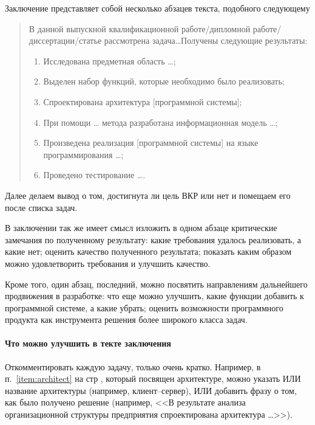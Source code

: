 \documentclass[a4paper,14pt,final]{extreport}
\begin{document}
Заключение представляет собой несколько абзацев текста, подобного следующему
\begin{quote}
В данной выпускной квалификационной работе/дипломной работе/диссертации/статье рассмотрена задача\ldots Получены следующие результаты:
\begin{enumerate}
\item Исследована предметная область \ldots{};
\item Выделен набор функций, которые необходимо было реализовать;
\item Спроектирована архитектура [программной системы]; \label{item:architect}
\item При помощи \ldots{} метода разработана информационная модель \ldots{};
\item Произведена реализация [программной системы] на языке программирования \ldots{};
\item Проведено тестирование \ldots{}.
\end{enumerate}
\end{quote}

Далее делаем вывод о том, достигнута ли цель ВКР или нет и помещаем его после списка задач.

В заключении так же имеет смысл изложить в одном абзаце критические замечания по полученному результату: какие требования удалось реализовать, а какие нет; оценить качество полученного результата; показать каким образом можно удовлетворить требования и улучшить качество.

Кроме того, один абзац, последний, можно посвятить направлениям дальнейшего продвижения в разработке: что еще можно улучшить, какие функции добавить к программной системе, а какие убрать; оценить возможности программного продукта как инструмента решения более широкого класса задач.

\paragraph{Что можно улучшить в текте заключения}

Откомментировать каждую задачу, только очень кратко.  Например, в п.~\ref{item:architect} на стр \pageref{item:architect}, который посвящен архитектуре, можно указать ИЛИ название архитектуры (например, клиент--сервер), ИЛИ добавить фразу о том, как было получено решение (например, <<В результате анализа организационной структуры предприятия спроектирована архитектура \ldots{}>>).

\vspace{1em}
\end{document}
